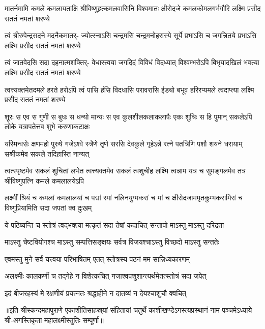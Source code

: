 


\fourlineindentedshloka
{मातर्नमामि कमले कमलायताक्षि}
{श्रीविष्णुहृत्कमलवासिनि विश्वमातः}
{क्षीरोदजे कमलकोमलगर्भगौरि}
{लक्ष्मि प्रसीद सततं नमतां शरण्ये}%

\fourlineindentedshloka
{त्वं श्रीरुपेन्द्रसदने मदनैकमातर्-}
{ज्योत्स्नाऽसि चन्द्रमसि चन्द्रमनोहरास्ये}
{सूर्ये प्रभाऽसि च जगत्त्रितये प्रभाऽसि}
{लक्ष्मि प्रसीद सततं नमतां शरण्ये}%
 

\fourlineindentedshloka
{त्वं जातवेदसि सदा दहनात्मशक्तिर्-}
{वेधास्त्वया जगदिदं विविधं विदध्यात्}
{विश्वम्भरोऽपि बिभृयादखिलं भवत्या}
{लक्ष्मि प्रसीद सततं नमतां शरण्ये}%

\fourlineindentedshloka
{त्वत्त्यक्तमेतदमले हरते हरोऽपि}
{त्वं पासि हंसि विदधासि परावरासि}
{ईड्यो बभूव हरिरप्यमले त्वदाप्त्या}
{लक्ष्मि प्रसीद सततं नमतां शरण्ये}%

\fourlineindentedshloka
{शूरः स एव स गुणी स बुधः स धन्यो}
{मान्यः स एव कुलशीलकलाकलापैः}
{एकः शुचिः स हि पुमान् सकलेऽपि लोके}
{यत्रापतेत्तव शुभे करुणाकटाक्षः}%

\fourlineindentedshloka
{यस्मिन्वसेः क्षणमहो पुरुषे गजेऽश्वे}
{स्त्रैणे तृणे सरसि देवकुले गृहेऽन्ने}
{रत्ने पतत्रिणि पशौ शयने धरायाम्}
{सश्रीकमेव सकले तदिहास्ति नान्यत्}%

\fourlineindentedshloka
{त्वत्स्पृष्टमेव सकलं शुचितां लभेत}
{त्वत्त्यक्तमेव सकलं त्वशुचीह लक्ष्मि}
{त्वन्नाम यत्र च सुमङ्गलमेव तत्र}
{श्रीविष्णुपत्नि कमले कमलालयेऽपि}%

\fourlineindentedshloka
{लक्ष्मीं श्रियं च कमलां कमलालयां च}
{पद्मां रमां नलिनयुग्मकरां च मां च}
{क्षीरोदजाममृतकुम्भकरामिरां च}
{विष्णुप्रियामिति सदा जपतां क्व दुःखम्}%

\twolineshloka
{ये पठिष्यन्ति च स्तोत्रं त्वद्भक्त्या मत्कृतं सदा}
{तेषां कदाचित् सन्तापो माऽस्तु माऽस्तु दरिद्रता}%

\twolineshloka
{माऽस्तु चेष्टवियोगश्च माऽस्तु सम्पत्तिसङ्क्षयः}
{सर्वत्र विजयश्चाऽस्तु विच्छदो माऽस्तु सन्ततेः}%


\twolineshloka
{एवमस्तु मुने सर्वं यत्त्वया परिभाषितम्}
{एतत् स्तोत्रस्य पठनं मम सान्निध्यकारणम्}%

\twolineshloka
{अलक्ष्मीः कालकर्णी च तद्गेहे न विशेत्कचित्}
{गजाश्वपशुशान्त्यर्थमेतत्स्तोत्रं सदा जपेत्}%

\twolineshloka
{इदं बीजरहस्यं मे रक्षणीयं प्रयत्नतः}
{श्रद्धाहीने न दातव्यं न देयश्चाशुचौ क्वचित्}%

॥इति श्रीस्कन्दमहापुराणे एकाशीतिसाहस्र्यां संहितायां चतुर्थे काशीखण्डेऽगस्त्यप्रस्थानं नाम पञ्चमेऽध्याये श्री-अगस्तिकृता महालक्ष्मीस्तुतिः सम्पूर्णा॥

